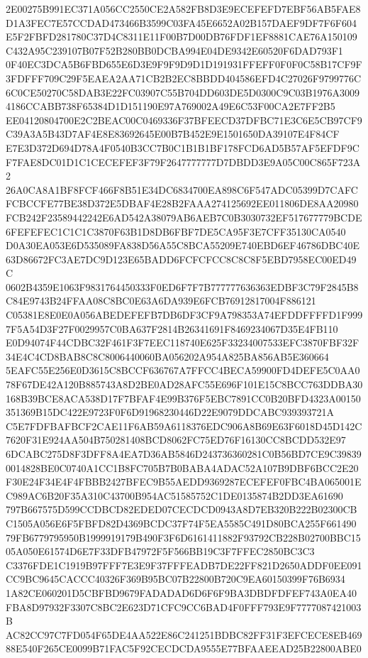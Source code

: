 \documentclass[UTF8,fontset=fandol,zihao=-4,a4paper]{ctexart}
\begin{document}
{{2E00275B991EC371A056CC2550CE2A582FB8D3E9ECEFEFD7EBF56AB5FAE8D1A3FEC7E57CCDAD473466B3599C03FA45E6652A02B157DAEF9DF7F6F604
E5F2FBFD281780C37D4C8311E11F00B7D00DB76FDF1EF8881CAE76A150109C432A95C239107B07F52B280BB0DCBA994E04DE9342E60520F6DAD793F1
0F40EC3DCA5B6FBD655E6D3E9F9F9D9D1D191931FFEFF0F0F0C58B17CF9F3FDFFF709C29F5EAEA2AA71CB2B2EC8BBDD404586EFD4C27026F9799776C
6C0CE50270C58DAB3E22FC03907C55B704DD603DE5D0300C9C03B1976A30094186CCABB738F65384D1D151190E97A769002A49E6C53F00CA2E7FF2B5
EE04120804700E2C2BEAC00C0469336F37BFEECD37DFBC71E3C6E5CB97CF9C39A3A5B43D7AF4E8E83692645E00B7B452E9E1501650DA39107E4F84CF
E7E3D372D694D78A4F0540B3CC7B0C1B1B1BF178FCD6AD5B57AF5EFDF9CF7FAE8DC01D1C1CECEFEF3F79F2647777777D7DBDD3E9A05C00C865F723A2
26A0CA8A1BF8FCF466F8B51E34DC6834700EA898C6F547ADC05399D7CAFCFCBCCFE77BE38D372E5DBAF4E28B2FAAA274125692EE011806DE8AA20980
FCB242F23589442242E6AD542A38079AB6AEB7C0B3030732EF517677779BCDE6FEFEFEC1C1C1C3870F63B1D8DB6FBF7DE5CA95F3E7CFF35130CA0540
D0A30EA053E6D535089FA838D56A55C8BCA55209E740EBD6EF46786DBC40E63D86672FC3AE7DC9D123E65BADD6FCFCFCC8C8C8F5EBD7958EC00ED49C
0602B4359E1063F9831764450333F0ED6F7F7B777777636363EDBF3C79F2845B8C84E9743B24FFAA08C8BC0E63A6DA939E6FCB76912817004F886121
C05381E8E0E0A056ABEDEFEFB7DB6DF3CF9A798353A74EFDDFFFFD1F9997F5A54D3F27F0029957C0BA637F2814B26341691F8469234067D35E4FB110
E0D94074F44CDBC32F461F3F7EEC118740E625F33234007533EFC3870FBF32F34E4C4CD8BAB8C8C8006440060BA056202A954A825BA856AB5E360664
5EAFC55E256E0D3615C8BCCF636767A7FFCC4BECA59900FD4DEFE5C0AA078F67DE42A120B885743A8D2BE0AD28AFC55E696F101E15C8BCC763DDBA30
168B39BCE8ACA538D17F7BFAF4E99B376F5EBC7891CC0B20BFD4323A00150351369B15DC422E9723F0F6D91968230446D22E9079DDCABC939393721A
C5E7FDFBAFBCF2CAE11F6AB59A6118376EDC906A8B69E63F6018D45D142C7620F31E924AA504B750281408BCD8062FC75ED76F16130CC8BCDD532E97
6DCABC275D8F3DFF8A4EA7D36AB5846D243736360281C0B56BD7CE9C398390014828BE0C0740A1CC1B8FC705B7B0BABA4ADAC52A107B9DBF6BCC2E20
F30E24F34E4F4FBBB2427BFEC9B55AEDD9369287ECEFEF0FBC4BA065001EC989AC6B20F35A310C43700B954AC51585752C1DE0135874B2DD3EA61690
797B667575D599CCDBCD82EDED07CECDCD0943A8D7EB320B222B02300CBC1505A056E6F5FBFD82D4369BCDC37F74F5EA5585C491D80BCA255F661490
79FB6779795950B1999919179B490F3F6D6161411882F93792CB228B02700BBC1505A050E61574D6E7F33DFB47972F5F566BB19C3F7FFEC2850BC3C3
C3376FDE1C1919B97FFF7E3E9F37FFFEADB7DE22FF821D2650ADDF0EE091CC9BC9645CACCC40326F369B95BC07B22800B720C9EA60150399F76B6934
1A82CE060201D5CBFBD9679FADADAD6D6F6F9BA3DBDFDFEF743A0EA40FBA8D97932F3307C8BC2E623D71CFC9CC6BAD4F0FFF793E9F7777087421003B
AC82CC97C7FD054F65DE4AA522E86C241251BDBC82FF31F3EFCECE8EB46988E540F265CE0099B71FAC5F92CECDCDA9555E77BFAAEEAD25B22800ABE0
}}
\end{document}
